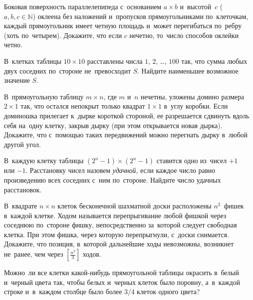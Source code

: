 


\begin{problems}

\item
Боковая поверхность параллелепипеда с~основанием $a\times b$ и~высотой~$c$
($a, b, c \in \mathbb{N}$) оклеена без наложений и~пропусков прямоугольниками
по~клеточкам, каждый прямоугольник имеет четную площадь и~может перегибаться
по~ребру (хоть по~четырем).
Докажите, что если $c$ нечетно, то~число способов оклейки четно.

\item
В~клетках таблицы $10 \times 10$ расставлены числа $1$, $2$, \ldots, $100$ так,
что сумма любых двух соседних по~стороне не~превосходит $S$.
Найдите наименьшее возможное значение $S$.

\item
В~прямоугольную таблицу $m \times n$, где $m$ и~$n$ нечетны, уложены домино
размера $2 \times 1$ так, что остался непокрыт только квадрат $1 \times 1$
в~углу коробки.
Если доминошка прилегает к~дырке короткой стороной, ее разрешается сдвинуть
вдоль себя на~одну клетку, закрыв дырку (при этом открывается новая дырка).
Докажите, что с~помощью таких передвижений можно перегнать дырку в~любой другой
угол.

\item
В~каждую клетку таблицы $(2^{n} - 1) \times (2^{n} - 1)$ ставится одно из~чисел
$+1$ или $-1$.
Расстановку чисел назовем \emph{удачной,} если каждое число равно произведению
всех соседних с~ним по~стороне.
Найдите число удачных расстановок.

\item
В~квадрате $n \times n$ клеток бесконечной шахматной доски расположены
$n^2$~фишек в~каждой клетке.
Ходом называется перепрыгивание любой фишкой через соседнюю по~стороне фишку,
непосредственно за~которой следует свободная клетка.
При этом фишка, через которую перепрыгнули, с~доски снимается.
Докажите, что позиция, в~которой дальнейшие ходы невозможны, возникнет
не~ранее, чем через $[\frac{n^2}{3}]$ ходов.

\item
Можно~ли все клетки какой-нибудь прямоугольной таблицы окрасить в~белый
и~черный цвета так, чтобы белых и~черных клеток было поровну, а~в~каждой строке
и~в~каждом столбце было более 3/4 клеток одного цвета?


\end{problems}
